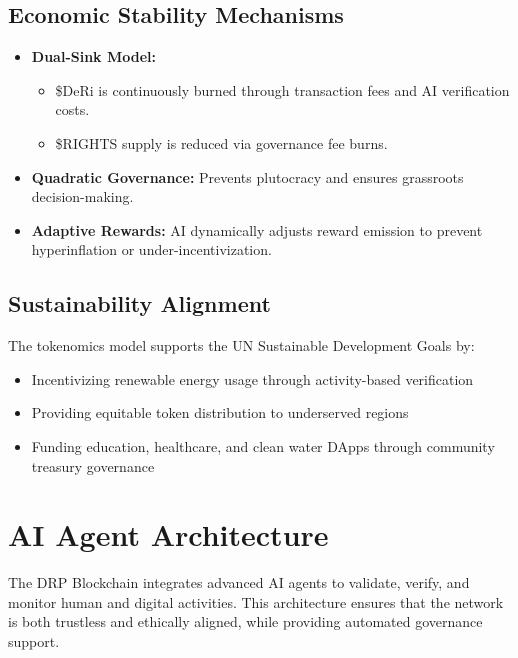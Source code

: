 \documentclass[11pt,a4paper]{article}
\begin{document}
\subsection{Economic Stability Mechanisms}
\begin{itemize}
    \item \textbf{Dual-Sink Model:}  
        \begin{itemize}
            \item \$DeRi is continuously burned through transaction fees and AI verification costs.  
            \item \$RIGHTS supply is reduced via governance fee burns.  
        \end{itemize}
    \item \textbf{Quadratic Governance:} Prevents plutocracy and ensures grassroots decision-making.  
    \item \textbf{Adaptive Rewards:} AI dynamically adjusts reward emission to prevent hyperinflation or under-incentivization.  
\end{itemize}

\subsection{Sustainability Alignment}
The tokenomics model supports the UN Sustainable Development Goals by:  
\begin{itemize}
    \item Incentivizing renewable energy usage through activity-based verification  
    \item Providing equitable token distribution to underserved regions  
    \item Funding education, healthcare, and clean water DApps through community treasury governance  
\end{itemize}

\section{AI Agent Architecture}

The DRP Blockchain integrates advanced AI agents to validate, verify, and monitor human and digital activities. This architecture ensures that the network is both trustless and ethically aligned, while providing automated governance support.
\end{document}
